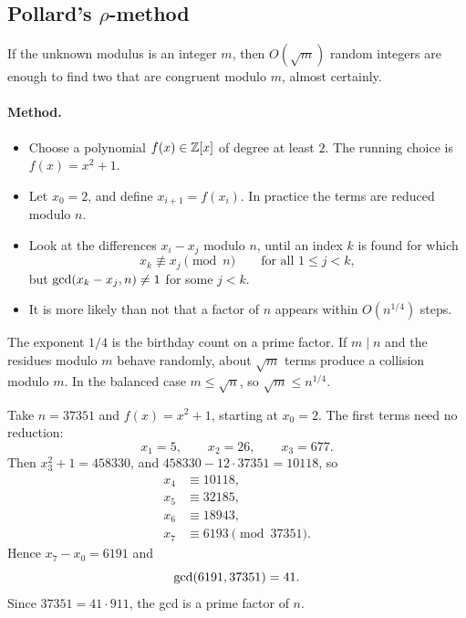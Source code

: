 \subsection{Pollard's \texorpdfstring{$\rho$}{rho}-method}

If the unknown modulus is an integer $m$, then $O(\sqrt{m})$ random integers are enough to find two that are congruent modulo $m$, almost certainly.

\paragraph{Method.}
\begin{itemize}[leftmargin=1.4em]
    \item Choose a polynomial $f(x)\in\mathbb Z[x]$ of degree at least $2$. The running choice is $f(x)=x^2+1$.
    \item Let $x_0=2$, and define $x_{i+1}=f(x_i)$. In practice the terms are reduced modulo $n$.
    \item Look at the differences $x_i-x_j$ modulo $n$, until an index $k$ is found for which
    \[
        x_k\not\equiv x_j\pmod{n}
        \qquad\text{for all }1\le j<k,
    \]
    but $\operatorname{gcd}(x_k-x_j,n)\ne 1$ for some $j<k$.
    \item It is more likely than not that a factor of $n$ appears within $O(n^{1/4})$ steps.
\end{itemize}

The exponent $1/4$ is the birthday count on a prime factor. If $m\mid n$ and the residues modulo $m$ behave randomly, about $\sqrt{m}$ terms produce a collision modulo $m$. In the balanced case $m\le\sqrt{n}$, so $\sqrt{m}\le n^{1/4}$.


\begin{example}
Take $n=37351$ and $f(x)=x^2+1$, starting at $x_0=2$. The first terms need no reduction:
\[
    x_1=5, \qquad x_2=26, \qquad x_3=677.
\]
Then $x_3^2+1=458330$, and $458330-12\cdot 37351=10118$, so
\begin{align*}
    x_4 &\equiv 10118,\\
    x_5 &\equiv 32185,\\
    x_6 &\equiv 18943,\\
    x_7 &\equiv 6193 \pmod{37351}.
\end{align*}
Hence $x_7-x_0=6191$ and
\[
    \operatorname{gcd}(6191,37351)=41.
\]
Since $37351=41\cdot 911$, the gcd is a prime factor of $n$.
\end{example}

